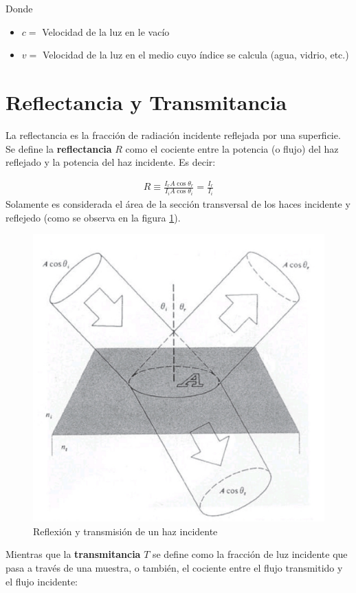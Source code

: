 \documentclass[
aps,
reprint,
amsmath, amssymb,
superscriptaddress,
]{revtex4-2}
\begin{document}
Donde
\begin{itemize}
    \item $c =$ Velocidad de la luz en le vacío
    \item $v =$ Velocidad de la luz en el medio cuyo índice se calcula (agua, vidrio, etc.)
\end{itemize}

\section{\label{sec:ref_tram}Reflectancia y Transmitancia}
La reflectancia es la fracción de radiación incidente reflejada por una superficie.
Se define la \textbf{reflectancia} $R$ como el cociente entre la potencia (o flujo) del haz reflejado y la potencia del haz incidente. Es decir:

\begin{gather*}
    R \equiv \frac{I_r A\cos{\theta_r}}{I_i A \cos{\theta_i}} = \frac{I_r}{I_i}
\end{gather*}
Solamente es considerada el área de la sección transversal de los haces incidente y reflejedo (como se observa en la figura \ref{fig:img1}).\\

\begin{figure}
    \centering
    \includegraphics[width=0.8\columnwidth]{img/img1.jpg}
    \caption{Reflexión y transmisión de un haz incidente}
    \label{fig:img1}
\end{figure}

Mientras que la \textbf{transmitancia} $T$ se define como la fracción de luz incidente que pasa a través de una muestra, o también, el cociente entre el flujo transmitido y el flujo incidente:
\end{document}
